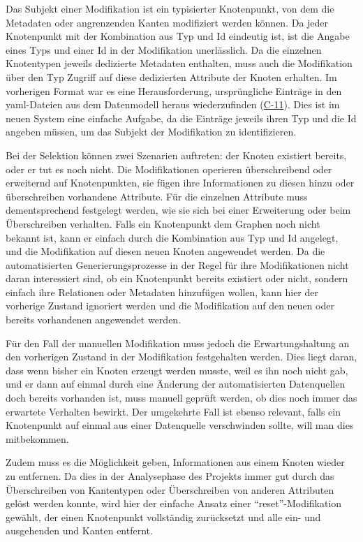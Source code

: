 Das Subjekt einer Modifikation ist ein typisierter Knotenpunkt, von dem die Metadaten oder angrenzenden Kanten modifiziert werden können.
Da jeder Knotenpunkt mit der Kombination aus Typ und Id eindeutig ist, ist die Angabe eines Typs und einer Id in der Modifikation unerlässlich.
Da die einzelnen Knotentypen jeweils dedizierte Metadaten enthalten, muss auch die Modifikation über den Typ Zugriff auf diese dedizierten Attribute der Knoten erhalten.
Im vorherigen Format war es eine Herausforderung, ursprüngliche Einträge in den \acrshort{yaml}-Dateien aus dem Datenmodell heraus wiederzufinden (\hyperref[subsec:c-11-finding-yaml-entries]{C-11}).
Dies ist im neuen System eine einfache Aufgabe, da die Einträge jeweils ihren Typ und die Id angeben müssen, um das Subjekt der Modifikation zu identifizieren.

Bei der Selektion können zwei Szenarien auftreten: der Knoten existiert bereits, oder er tut es noch nicht.
Die Modifikationen operieren überschreibend oder erweiternd auf Knotenpunkten, sie fügen ihre Informationen zu diesen hinzu oder überschreiben vorhandene Attribute.
Für die einzelnen Attribute muss dementsprechend festgelegt werden, wie sie sich bei einer Erweiterung oder beim Überschreiben verhalten.
Falls ein Knotenpunkt dem Graphen noch nicht bekannt ist, kann er einfach durch die Kombination aus Typ und Id angelegt, und die Modifikation auf diesen neuen Knoten angewendet werden.
Da die automatisierten Generierungsprozesse in der Regel für ihre Modifikationen nicht daran interessiert sind, ob ein Knotenpunkt bereits existiert oder nicht, sondern einfach ihre Relationen oder Metadaten hinzufügen wollen, kann hier der vorherige Zustand ignoriert werden und die Modifikation auf den neuen oder bereits vorhandenen angewendet werden.

Für den Fall der manuellen Modifikation muss jedoch die Erwartungshaltung an den vorherigen Zustand in der Modifikation festgehalten werden.
Dies liegt daran, dass wenn bisher ein Knoten erzeugt werden musste, weil es ihn noch nicht gab, und er dann auf einmal durch eine Änderung der automatisierten Datenquellen doch bereits vorhanden ist, muss manuell geprüft werden, ob dies noch immer das erwartete Verhalten bewirkt.
Der umgekehrte Fall ist ebenso relevant, falls ein Knotenpunkt auf einmal aus einer Datenquelle verschwinden sollte, will man dies mitbekommen.

Zudem muss es die Möglichkeit geben, Informationen aus einem Knoten wieder zu entfernen.
Da dies in der Analysephase des Projekts immer gut durch das Überschreiben von Kantentypen oder Überschreiben von anderen Attributen gelöst werden konnte, wird hier der einfache Ansatz einer \enquote{reset}-Modifikation gewählt, der einen Knotenpunkt vollständig zurücksetzt und alle ein- und ausgehenden und Kanten entfernt.

